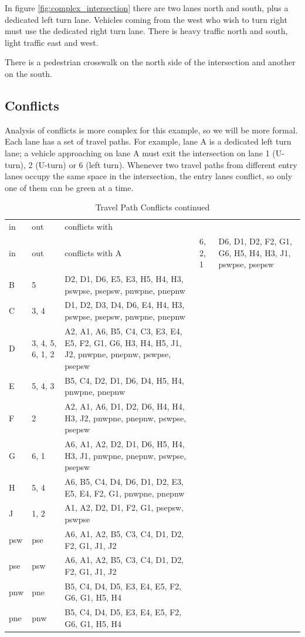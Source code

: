 \documentclass[letterpaper,twoside]{article}
\begin{document}
In figure \ref{fig:complex_intersection} there are two lanes
north and south, plus a dedicated left turn lane.  Vehicles
coming from the west who wish to turn right must use the
dedicated right turn lane.  There is heavy traffic north
and south, light traffic east and west.

There is a pedestrian crosswalk on the north side of the intersection
and another on the south.

\subsection{Conflicts}

Analysis of conflicts is more complex for this example, so we
will be more formal.  Each lane has a set of travel paths.
For example, lane A is a dedicated left turn lane; a vehicle approaching on
lane A must exit the intersection on lane 1 (U-turn), 2 (U-turn)
or 6 (left turn).  Whenever two travel paths from different entry lanes
occupy the same space in the intersection, the entry lanes
conflict, so only one of them can be green at a time.

\begin{longtable}{l |l| p{8cm}}
  \caption{Travel Path Conflicts} \\
  in & out & conflicts with \endfirsthead
  \caption{Travel Path Conflicts continued} \\
  in & out & conflicts with \endhead
  \hline
  A & 6, 2, 1 & D6, D1, D2, F2, G1, G6, H5, H4, H3, J1, pswpse, psepsw \\
  B & 5 & D2, D1, D6, E5, E3, H5, H4, H3, pswpse, psepsw, pnwpne, pnepnw \\
  C & 3, 4 & D1, D2, D3, D4, D6, E4, H4, H3, pswpse, psepsw, pnwpne, pnepnw \\
  D & 3, 4, 5, 6, 1, 2 & A2, A1, A6, B5, C4, C3, E3, E4, E5, F2, G1, G6, H3,
  H4, H5, J1, J2, pnwpne, pnepnw, pswpse, psepsw \\
  E & 5, 4, 3 & B5, C4, D2, D1, D6, D4, H5, H4, pnwpne, pnepnw  \\
  F & 2 & A2, A1, A6, D1, D2, D6, H4, H4, H3, J2, pnwpne, pnepnw, pswpse,
  psepsw \\
  G & 6, 1 & A6, A1, A2, D2, D1, D6, H5, H4, H3, J1, pnwpne, pnepnw, pswpse,
  psepsw \\
  H & 5, 4 & A6, B5, C4, D4, D6, D1, D2, E3, E5, E4, F2, G1, pnwpne, pnepnw \\
  J & 1, 2 & A1, A2, D2, D1, F2, G1, psepsw, pswpse \\
  psw & pse & A6, A1, A2, B5, C3, C4, D1, D2, F2, G1, J1, J2 \\
  pse & psw & A6, A1, A2, B5, C3, C4, D1, D2, F2, G1, J1, J2 \\
  pnw & pne & B5, C4, D4, D5, E3, E4, E5, F2, G6, G1, H5, H4 \\
  pne & pnw & B5, C4, D4, D5, E3, E4, E5, F2, G6, G1, H5, H4 \\
\end{longtable}
\end{document}

